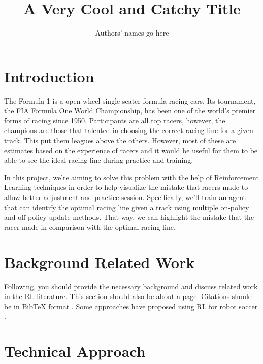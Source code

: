 \documentclass{article}
\title{A Very Cool and Catchy Title}
\author{Authors' names go here }
\date{\vspace{-1em}}
\begin{document}
\maketitle


\section{Introduction}

The Formula 1 is a open-wheel single-seater formula racing cars. Its tournament,
the FIA Formula One World Championship, has been one of the world's premier forms of racing since 1950.
Participants are all top racers, however, the champions are those that talented
in choosing the correct racing line for a given track. This put them
leagues above the others. However, most of these are estimates based on the
experience of racers and it would be useful for them to be able to see the ideal
racing line during practice and training.

In this project, we're aiming to solve this problem with the help of
Reinforcement Learning techniques in order to help visualize the mistake that
racers made to allow better adjustment and practice session. Specifically, we'll
train an agent that can identify the optimal racing line given a track using
multiple on-policy and off-policy update methods. That way, we can highlight the
mistake that the racer made in comparison with the optimal racing line.


\section{Background Related Work}

Following, you should provide the necessary background and discuss related work in the RL literature. This section should also be about a page. Citations should be in BibTeX format \citep{thrun2005probabilistic}. Some approaches have proposed using RL for robot soccer \cite{riedmiller2009reinforcement}.

\section{Technical Approach}
\end{document}
